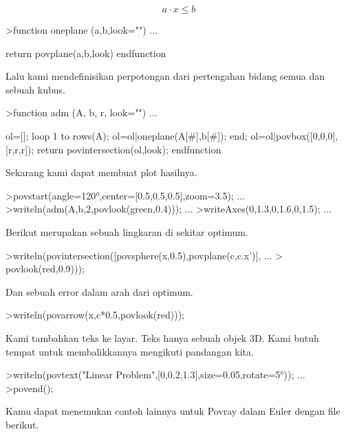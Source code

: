\documentclass[a4paper,10pt]{article}
\begin{document}
\begin{eulernotebook}
\begin{eulercomment}
\end{eulercomment}
\begin{eulerformula}
\[
a \cdot x \le b
\]
\end{eulerformula}
\begin{eulerprompt}
>function oneplane (a,b,look="") ...
\end{eulerprompt}
\begin{eulerudf}
    return povplane(a,b,look)
  endfunction
\end{eulerudf}
\begin{eulercomment}
Lalu kami mendefinisikan perpotongan dari pertengahan bidang semua dan
sebuah kubus.
\end{eulercomment}
\begin{eulerprompt}
>function adm (A, b, r, look="") ...
\end{eulerprompt}
\begin{eulerudf}
    ol=[];
    loop 1 to rows(A); ol=ol|oneplane(A[#],b[#]); end;
    ol=ol|povbox([0,0,0],[r,r,r]);
    return povintersection(ol,look);
  endfunction
\end{eulerudf}
\begin{eulercomment}
Sekarang kami dapat membuat plot hasilnya.
\end{eulercomment}
\begin{eulerprompt}
>povstart(angle=120°,center=[0.5,0.5,0.5],zoom=3.5); ...
>writeln(adm(A,b,2,povlook(green,0.4))); ...
>writeAxes(0,1.3,0,1.6,0,1.5); ...
\end{eulerprompt}
\begin{eulercomment}
Berikut merupakan sebuah lingkaran di sekitar optimum.
\end{eulercomment}
\begin{eulerprompt}
>writeln(povintersection([povsphere(x,0.5),povplane(c,c.x')], ...
>  povlook(red,0.9)));
\end{eulerprompt}
\begin{eulercomment}
Dan sebuah error dalam arah dari optimum.
\end{eulercomment}
\begin{eulerprompt}
>writeln(povarrow(x,c*0.5,povlook(red)));
\end{eulerprompt}
\begin{eulercomment}
Kami tambahkan teks ke layar. Teks hanya sebuah objek 3D. Kami butuh
tempat untuk membalikkannya mengikuti pandangan kita.
\end{eulercomment}
\begin{eulerprompt}
>writeln(povtext("Linear Problem",[0,0.2,1.3],size=0.05,rotate=5°)); ...
>povend();
\end{eulerprompt}
\begin{eulercomment}
Kamu dapat menemukan contoh lainnya untuk Povray dalam Euler dengan
file berikut.


\end{eulercomment}
\end{eulernotebook}
\end{document}
